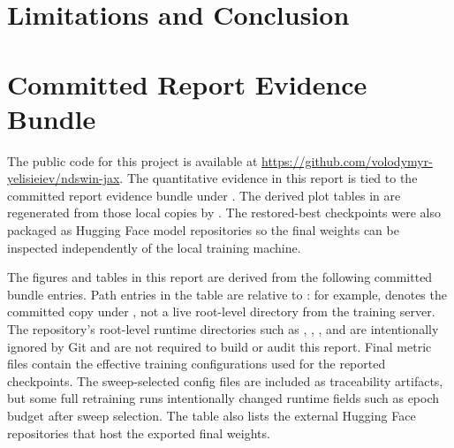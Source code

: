 \documentclass[a4paper,oneside,10pt,english]{scrartcl}
\begin{document}
\section{Limitations and Conclusion}
\label{sec:limitations}


\printbibliography

\appendix
\section{Committed Report Evidence Bundle}
\label{app:artifacts}
The public code for this project is available at \url{https://github.com/volodymyr-yelisieiev/ndswin-jax}. The quantitative evidence in this report is tied to the committed report evidence bundle under . The derived plot tables in  are regenerated from those local copies by . The restored-best checkpoints were also packaged as Hugging Face model repositories so the final weights can be inspected independently of the local training machine.

The figures and tables in this report are derived from the following committed bundle entries. Path entries in the table are relative to : for example,  denotes the committed copy under , not a live root-level  directory from the training server. The repository's root-level runtime directories such as , , , and  are intentionally ignored by Git and are not required to build or audit this report. Final metric files contain the effective training configurations used for the reported checkpoints. The sweep-selected config files are included as traceability artifacts, but some full retraining runs intentionally changed runtime fields such as epoch budget after sweep selection. The table also lists the external Hugging Face repositories that host the exported final weights.
\end{document}
